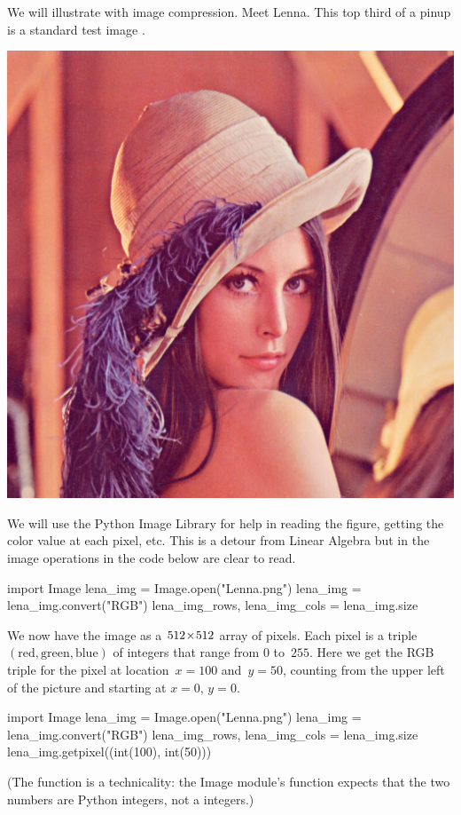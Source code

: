 We will illustrate with image compression.
Meet Lenna.
This top third of a pinup is a standard test image
\cite{wiki:Lenna}.
\begin{center}
  \includegraphics{Lenna.png} %
\end{center}

We will use the Python Image Library for help in reading the figure, 
getting the color value at each pixel, etc.
This is a detour from Linear Algebra but in the image operations in 
the code below are clear to read.
\begin{sageoutput}
import Image
lena_img = Image.open("Lenna.png")
lena_img = lena_img.convert("RGB")
lena_img_rows, lena_img_cols = lena_img.size
\end{sageoutput}
We now have the image as a $512 \! \times \! 512$ array of pixels.
Each pixel is a triple 
$(\text{red}, \text{green},\text{blue})$ of integers that range from 
$0$ to~$255$.
Here we get the RGB triple for the pixel at location~$x=100$ and~$y=50$,
counting from the upper left of the picture and starting at $x=0$, 
$y=0$. 
\begin{sageoutput}[d,0,4]
import Image
lena_img = Image.open("Lenna.png")
lena_img = lena_img.convert("RGB")
lena_img_rows, lena_img_cols = lena_img.size
lena_img.getpixel((int(100), int(50)))
\end{sageoutput}
\noindent (The  function is a 
technicality: the Image module's  function 
expects that the two numbers are Python integers, not a \Sage{}
integers.)

